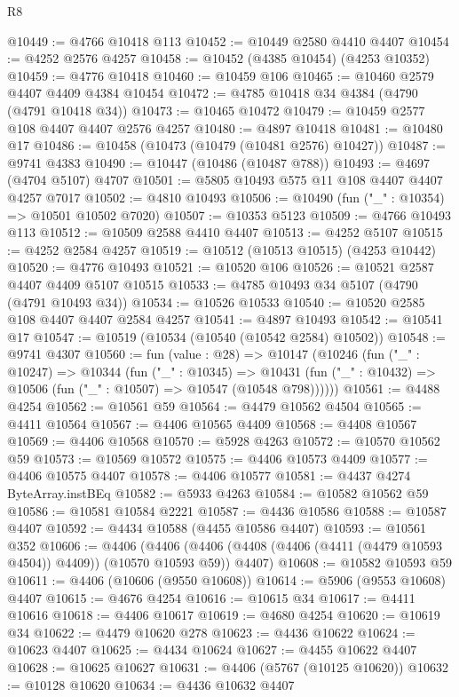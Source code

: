 \begin{lexlean}{R8}
\begin{coremodule}
@10449 := @4766 @10418 @113
@10452 := @10449 @2580 @4410 @4407
@10454 := @4252 @2576 @4257
@10458 := @10452 (@4385 @10454) (@4253 @10352)
@10459 := @4776 @10418
@10460 := @10459 @106
@10465 := @10460 @2579 @4407 @4409 @4384 @10454
@10472 := @4785 @10418 @34 @4384 (@4790 (@4791 @10418 @34))
@10473 := @10465 @10472
@10479 := @10459 @2577 @108 @4407 @4407 @2576 @4257
@10480 := @4897 @10418
@10481 := @10480 @17
@10486 := @10458 (@10473 (@10479 (@10481 @2576) @10427))
@10487 := @9741 @4383
@10490 := @10447 (@10486 (@10487 @788))
@10493 := @4697 (@4704 @5107) @4707
@10501 := @5805 @10493 @575 @11 @108 @4407 @4407 @4257 @7017
@10502 := @4810 @10493
@10506 := @10490 (fun ("_" : @10354) => @10501 @10502 @7020)
@10507 := @10353 @5123
@10509 := @4766 @10493 @113
@10512 := @10509 @2588 @4410 @4407
@10513 := @4252 @5107
@10515 := @4252 @2584 @4257
@10519 := @10512 (@10513 @10515) (@4253 @10442)
@10520 := @4776 @10493
@10521 := @10520 @106
@10526 := @10521 @2587 @4407 @4409 @5107 @10515
@10533 := @4785 @10493 @34 @5107 (@4790 (@4791 @10493 @34))
@10534 := @10526 @10533
@10540 := @10520 @2585 @108 @4407 @4407 @2584 @4257
@10541 := @4897 @10493
@10542 := @10541 @17
@10547 := @10519 (@10534 (@10540 (@10542 @2584) @10502))
@10548 := @9741 @4307
@10560 := fun (value : @28) =>
  @10147
    (@10246
      (fun ("_" : @10247) =>
      @10344
        (fun ("_" : @10345) =>
        @10431 (fun ("_" : @10432) => @10506 (fun ("_" : @10507) => @10547 (@10548 @798))))))
@10561 := @4488 @4254
@10562 := @10561 @59
@10564 := @4479 @10562 @4504
@10565 := @4411 @10564
@10567 := @4406 @10565 @4409
@10568 := @4408 @10567
@10569 := @4406 @10568
@10570 := @5928 @4263
@10572 := @10570 @10562 @59
@10573 := @10569 @10572
@10575 := @4406 @10573 @4409
@10577 := @4406 @10575 @4407
@10578 := @4406 @10577
@10581 := @4437 @4274 ByteArray.instBEq
@10582 := @5933 @4263
@10584 := @10582 @10562 @59
@10586 := @10581 @10584 @2221
@10587 := @4436 @10586
@10588 := @10587 @4407
@10592 := @4434 @10588 (@4455 @10586 @4407)
@10593 := @10561 @352
@10606 := @4406
    (@4406 (@4406 (@4408 (@4406 (@4411 (@4479 @10593 @4504)) @4409)) (@10570 @10593 @59)) @4407)
@10608 := @10582 @10593 @59
@10611 := @4406 (@10606 (@9550 @10608))
@10614 := @5906 (@9553 @10608) @4407
@10615 := @4676 @4254
@10616 := @10615 @34
@10617 := @4411 @10616
@10618 := @4406 @10617
@10619 := @4680 @4254
@10620 := @10619 @34
@10622 := @4479 @10620 @278
@10623 := @4436 @10622
@10624 := @10623 @4407
@10625 := @4434 @10624
@10627 := @4455 @10622 @4407
@10628 := @10625 @10627
@10631 := @4406 (@5767 (@10125 @10620))
@10632 := @10128 @10620
@10634 := @4436 @10632 @4407

\end{coremodule}
\end{lexlean}
